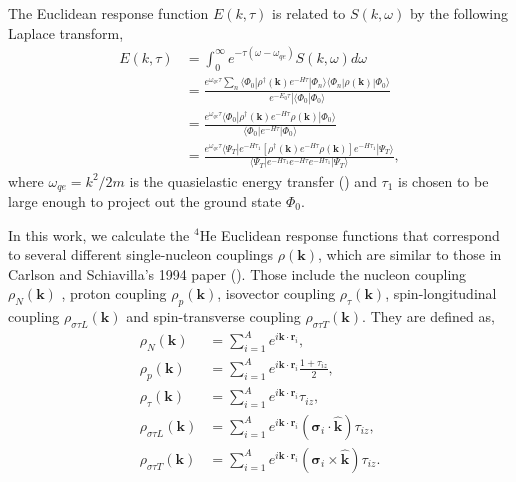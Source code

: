 \documentclass[12pt,letterpaper,UTF8]{report}
\begin{document}
The Euclidean response function $E(k,\tau)$ is related to $S(k,\omega)$ by the following Laplace transform,
\begin{align}
E(k,\tau) &=
\int_{0}^{\infty} e^{-\tau(\omega-\omega_{qe})} S(k,\omega) d\omega \nonumber \\
&= \frac{e^{\omega_{qe}\tau} \sum_n \langle \Phi_0 | \rho^\dagger(\bm{k}) e^{-H \tau}  | \Phi_n \rangle \langle \Phi_n | \rho(\bm{k})| \Phi_0 \rangle   }
{ e^{-E_0 \tau} | \langle \Phi_0 | \Phi_0 \rangle} \nonumber \\
&=\frac{ e^{\omega_{qe}\tau} \langle \Phi_0| \rho^\dagger(\bm{k}) e^{-H\tau} \rho(\bm{k}) | \Phi_0 \rangle}{\langle \Phi_0| e^{-H\tau} | \Phi_0 \rangle} \nonumber \\
&=\frac{ e^{\omega_{qe}\tau} \langle \Psi_T | e^{-H \tau_1}
\left[\rho^\dagger(\bm{k}) e^{-H\tau} \rho(\bm{k})\right]
e^{-H \tau_1} | \Psi_T \rangle}
{\langle \Psi_T | e^{-H \tau_1} e^{-H\tau} e^{-H \tau_1} | \Psi_T \rangle},
\label{Ektauresponse}
\end{align}
where $\omega_{qe}=k^2/2m$ is the quasielastic energy transfer (\cite{lovato2020ab})  and $\tau_1$ is chosen to be large enough to project out the ground state $\Phi_0$.

In this work, we calculate the $^4$He Euclidean response functions that correspond to several different single-nucleon couplings $\rho(\bm{k})$, which are similar to those in Carlson and Schiavilla's 1994 paper (\cite{Carlson94a}).
Those include the nucleon coupling $\rho_N (\bm{k})$ , proton coupling $\rho_p (\bm{k})$, isovector coupling $\rho_\tau (\bm{k})$, spin-longitudinal coupling $\rho_{\sigma \tau L} (\bm{k})$ and spin-transverse coupling $\rho_{\sigma \tau T} (\bm{k})$. They are defined as,
\begin{align}
\rho_N (\bm{k}) & = \sum_{i=1}^{A} e^{i \bm{k} \cdot \bm{r}_i } , \\
\rho_p (\bm{k}) & = \sum_{i=1}^{A} e^{i \bm{k} \cdot \bm{r}_i } \frac{1+\tau_{iz}}{2} , \\
\rho_\tau (\bm{k}) & = \sum_{i=1}^{A} e^{i \bm{k} \cdot \bm{r}_i } \tau_{iz} , \\
\rho_{\sigma \tau L} (\bm{k}) & = \sum_{i=1}^{A} e^{i \bm{k} \cdot \bm{r}_i } (\bm{\sigma}_i \cdot \hat{\bm{k}}) \tau_{iz} , \\
\rho_{\sigma \tau T} (\bm{k}) & = \sum_{i=1}^{A} e^{i \bm{k} \cdot \bm{r}_i } (\bm{\sigma}_i \times \hat{\bm{k}}) \tau_{iz} .
\end{align}
\end{document}

